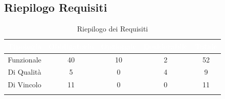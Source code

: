 \subsection{Riepilogo Requisiti}\label{Riepilogo}
\begin{center}
\begin{longtable}[c]{|c|c|c|c|c|}
\hline
\rowcolor{bluelogo}\textbf{\textcolor{white}{Tipologia}} & \textbf{\textcolor{white}{Obbligatorio}} & \textbf{\textcolor{white}{Opzionale}} & \textbf{\textcolor{white}{Desiderabile}} & \textbf{\textcolor{white}{Totale}}\\
\hline \hline
\endhead
Funzionale & 40 & 10 & 2 & 52\\
\hline
\rowcolor{grigio}Di Qualità & 5 & 0 & 4 & 9\\
\hline
Di Vincolo & 11 & 0 & 0 & 11\\
\hline
\caption{Riepilogo dei Requisiti}
\end{longtable}
\end{center}